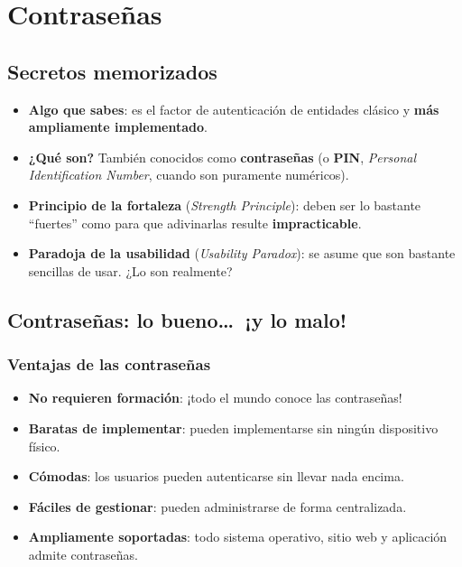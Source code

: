 \documentclass[11pt,a4paper]{report}
\begin{document}
\chapter{Contraseñas}
 
\section{Secretos memorizados}
 
\begin{itemize}
  \item \textbf{Algo que sabes}: es el factor de autenticación de entidades clásico y \textbf{más ampliamente implementado}.
  \item \textbf{¿Qué son?} También conocidos como \textbf{contraseñas} (o \textbf{PIN}, \emph{Personal Identification Number}, cuando son puramente numéricos).
  \item \textbf{Principio de la fortaleza} (\emph{Strength Principle}): deben ser lo bastante ``fuertes'' como para que adivinarlas resulte \textbf{impracticable}.
  \item \textbf{Paradoja de la usabilidad} (\emph{Usability Paradox}): se asume que son bastante sencillas de usar. ¿Lo son realmente?
\end{itemize}
 
\section{Contraseñas: lo bueno\ldots\ ¡y lo malo!}
 
\subsection{Ventajas de las contraseñas}
\begin{itemize}
  \item \textbf{No requieren formación}: ¡todo el mundo conoce las contraseñas!
  \item \textbf{Baratas de implementar}: pueden implementarse sin ningún dispositivo físico.
  \item \textbf{Cómodas}: los usuarios pueden autenticarse sin llevar nada encima.
  \item \textbf{Fáciles de gestionar}: pueden administrarse de forma centralizada.
  \item \textbf{Ampliamente soportadas}: todo sistema operativo, sitio web y aplicación admite contraseñas.
\end{itemize}
 
\end{document}
